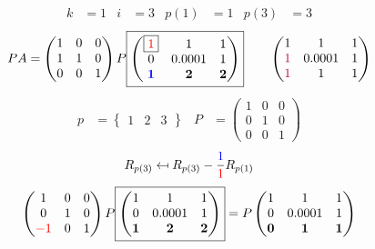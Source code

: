 \documentclass[pdf]{beamer}
\begin{document}
\begin{frame}{}\begin{align*} k &= 1 & i &= 3 & p(1) &= 1 & p(3) &= 3\end{align*} $$PA=\begin{pmatrix}1&0&0\\1&1&0\\0&0&1\end{pmatrix} P \boxed{\begin{pmatrix}\boxed{{\color{red}1}}&1&1\\0&0.0001&1\\\mathbf{{\color{blue}1}}&\mathbf{2}&\mathbf{2}\end{pmatrix}} \quad\quad \begin{pmatrix}1&1&1\\{\color{purple}1}&0.0001&1\\{\color{purple}1}&1&1\end{pmatrix}$$ \begin{align*} p&= \begin{Bmatrix}1&2&3\end{Bmatrix} & P&= \begin{pmatrix}1&0&0\\0&1&0\\0&0&1\end{pmatrix} \end{align*} $$R_{p(3)} \mapsfrom R_{p(3)} - \frac{{\color{blue}1}}{{\color{red}1}} R_{p(1)}$$ $$ \begin{pmatrix}1&0&0\\0&1&0\\{\color{red}-1}&0&1\end{pmatrix} P \boxed{\begin{pmatrix}1&1&1\\0&0.0001&1\\\mathbf{1}&\mathbf{2}&\mathbf{2}\end{pmatrix}} = P \begin{pmatrix}1&1&1\\0&0.0001&1\\\mathbf{0}&\mathbf{1}&\mathbf{1}\end{pmatrix} $$\end{frame}
\end{document}
